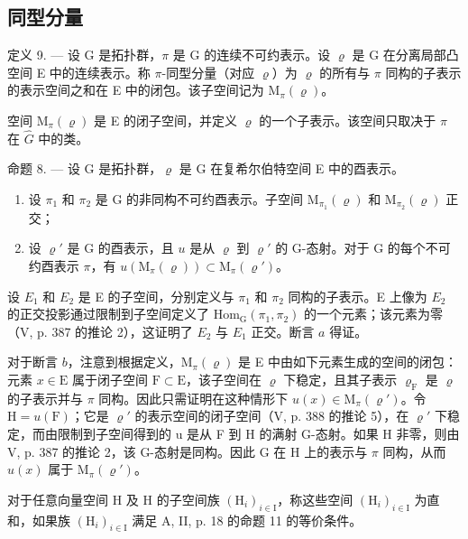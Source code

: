 \subsection{同型分量}

定义 9. --- 设 G 是拓扑群，\(\pi\) 是 G 的连续不可约表示。设 \(\varrho\) 是 G 在分离局部凸空间 E 中的连续表示。称 \(\pi\)-同型分量（对应 \(\varrho\)）为 \(\varrho\) 的所有与 \(\pi\) 同构的子表示的表示空间之和在 E 中的闭包。该子空间记为 \(\mathrm{M}_{\pi}(\varrho)\)。

空间 \(\mathrm{M}_{\pi}(\varrho)\) 是 E 的闭子空间，并定义 \(\varrho\) 的一个子表示。该空间只取决于 \(\pi\) 在 \(\widehat{G}\) 中的类。

命题 8. — 设 G 是拓扑群，\(\varrho\) 是 G 在复希尔伯特空间 E 中的酉表示。

\begin{enumerate}
\def\labelenumi{\alph{enumi})}
\item
  设 \(\pi_1\) 和 \(\pi_2\) 是 G 的非同构不可约酉表示。子空间 \(\mathrm{M}_{\pi_1}(\varrho)\) 和 \(\mathrm{M}_{\pi_2}(\varrho)\) 正交；
\item
  设 \(\varrho'\) 是 G 的酉表示，且 \(u\) 是从 \(\varrho\) 到 \(\varrho'\) 的 G-态射。对于 G 的每个不可约酉表示 \(\pi\)，有 \(u(\mathrm{M}_{\pi}(\varrho)) \subset \mathrm{M}_{\pi}(\varrho')\)。
\end{enumerate}

设 \(E_{1}\) 和 \(E_{2}\) 是 E 的子空间，分别定义与 \(\pi_{1}\) 和 \(\pi_{2}\) 同构的子表示。E 上像为 \(E_{2}\) 的正交投影通过限制到子空间定义了 \(\mathrm{Hom}_{\mathrm{G}}(\pi_{1},\pi_{2})\) 的一个元素；该元素为零（V, p. 387 的推论 2），这证明了 \(E_{2}\) 与 \(E_{1}\) 正交。断言 \(a\) 得证。

对于断言 \(b\)，注意到根据定义，\(\mathrm{M}_{\pi}(\varrho)\) 是 E 中由如下元素生成的空间的闭包：元素 \(x \in \mathrm{E}\) 属于闭子空间 \(\mathrm{F} \subset \mathrm{E}\)，该子空间在 \(\varrho\) 下稳定，且其子表示 \(\varrho_{\mathrm{F}}\) 是 \(\varrho\) 的子表示并与 \(\pi\) 同构。因此只需证明在这种情形下 \(u(x) \in \mathrm{M}_{\pi}(\varrho')\)。令 \(\mathrm{H} = u(\mathrm{F})\)；它是 \(\varrho'\) 的表示空间的闭子空间（V, p. 388 的推论 5），在 \(\varrho'\) 下稳定，而由限制到子空间得到的 u 是从 F 到 H 的满射 G-态射。如果 H 非零，则由 V, p. 387 的推论 2，该 G-态射是同构。因此 G 在 H 上的表示与 \(\pi\) 同构，从而 \(u(x)\) 属于 \(\mathrm{M}_{\pi}(\varrho')\)。

对于任意向量空间 H 及 H 的子空间族 \((\mathrm{H}_{i})_{i\in\mathrm{I}}\)，称这些空间 \((\mathrm{H}_{i})_{i\in\mathrm{I}}\) 为直和，如果族 \((\mathrm{H}_{i})_{i\in\mathrm{I}}\) 满足 A, II, p. 18 的命题 11 的等价条件。

